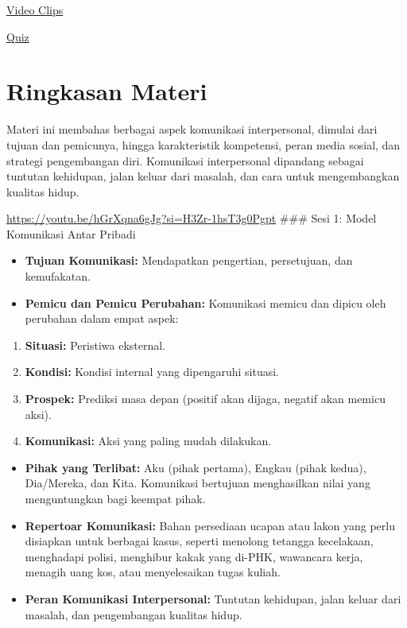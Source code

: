 \documentclass[
  letterpaper,
  DIV=11,
  numbers=noendperiod]{scrreprt}
\providecommand{\tightlist}{%
  \setlength{\itemsep}{0pt}\setlength{\parskip}{0pt}}
\begin{document}
\href{https://youtube.com/playlist?list=PL_m-BplfO92EHtF458s1yWRf6u0lGZQaZ&si=hAc9s5o7a4aHXJFO}{Video
Clips}

\href{https://forms.office.com/r/WCHBJJiwXc}{Quiz}

\section{Ringkasan Materi}\label{ringkasan-materi}

Materi ini membahas berbagai aspek komunikasi interpersonal, dimulai
dari tujuan dan pemicunya, hingga karakteristik kompetensi, peran media
sosial, dan strategi pengembangan diri. Komunikasi interpersonal
dipandang sebagai tuntutan kehidupan, jalan keluar dari masalah, dan
cara untuk mengembangkan kualitas hidup.

\url{https://youtu.be/hGrXqna6gJg?si=H3Zr-1hsT3g0Pgpt} \#\#\# Sesi 1:
Model Komunikasi Antar Pribadi

\begin{itemize}
\tightlist
\item
  \textbf{Tujuan Komunikasi:} Mendapatkan pengertian, persetujuan, dan
  kemufakatan.
\item
  \textbf{Pemicu dan Pemicu Perubahan:} Komunikasi memicu dan dipicu
  oleh perubahan dalam empat aspek:
\end{itemize}

\begin{enumerate}
\def\labelenumi{\arabic{enumi}.}
\tightlist
\item
  \textbf{Situasi:} Peristiwa eksternal.
\item
  \textbf{Kondisi:} Kondisi internal yang dipengaruhi situasi.
\item
  \textbf{Prospek:} Prediksi masa depan (positif akan dijaga, negatif
  akan memicu aksi).
\item
  \textbf{Komunikasi:} Aksi yang paling mudah dilakukan.
\end{enumerate}

\begin{itemize}
\tightlist
\item
  \textbf{Pihak yang Terlibat:} Aku (pihak pertama), Engkau (pihak
  kedua), Dia/Mereka, dan Kita. Komunikasi bertujuan menghasilkan nilai
  yang menguntungkan bagi keempat pihak.
\item
  \textbf{Repertoar Komunikasi:} Bahan persediaan ucapan atau lakon yang
  perlu disiapkan untuk berbagai kasus, seperti menolong tetangga
  kecelakaan, menghadapi polisi, menghibur kakak yang di-PHK, wawancara
  kerja, menagih uang kos, atau menyelesaikan tugas kuliah.
\item
  \textbf{Peran Komunikasi Interpersonal:} Tuntutan kehidupan, jalan
  keluar dari masalah, dan pengembangan kualitas hidup.
\end{itemize}
\end{document}
